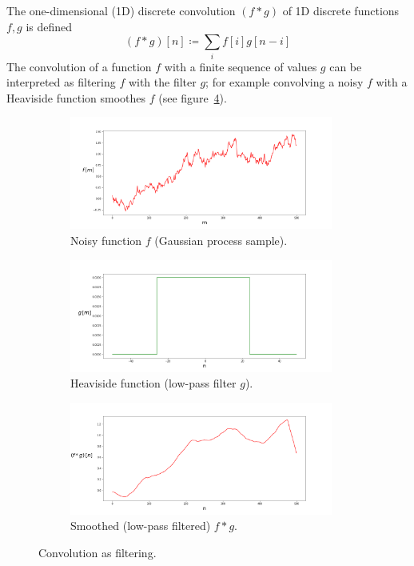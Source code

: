 The one-dimensional (1D) discrete convolution \((f*g)\) of 1D discrete functions \(f,g\) is defined
\begin{equation}
    (f*g)[n]\coloneqq \sum _{i} f[i]g[n-i]
    \label{eqn:1dconv}
\end{equation}
The convolution of a function \(f\) with a finite sequence of values \(g\) can be interpreted as filtering \(f\) with the filter \(g\); for example convolving a noisy \(f\) with a Heaviside function smoothes \(f\) (see figure~\ref{fig:convfiltering}).
\begin{figure}[!htbp]
    \centering
    \begin{subfigure}[b]{.49\textwidth}
        \centering
        \includegraphics[width=0.95\textwidth]{figures/neural_networks/unsmoothed.png}
        \caption{Noisy function \(f\) (Gaussian process sample).}\label{fig:convnoisy}
    \end{subfigure}

    \begin{subfigure}[b]{.49\textwidth}
        \centering
        \includegraphics[width=0.95\textwidth]{figures/neural_networks/kernel.png}
        \caption{Heaviside function (low-pass filter \(g\)).}\label{fig:convfilter}
    \end{subfigure}
    \begin{subfigure}[b]{.49\textwidth}
        \centering
        \includegraphics[width=0.95\textwidth]{figures/neural_networks/smoothed.png}
        \caption{Smoothed (low-pass filtered) \(f * g\).}\label{fig:convsmooth}
    \end{subfigure}
    \caption{Convolution as filtering.}\label{fig:convfiltering}
\end{figure}
